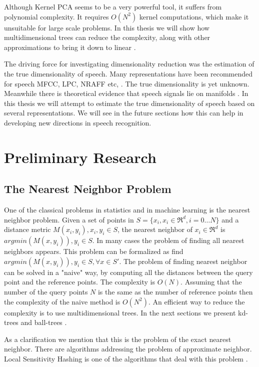 \documentclass[12pt,letterpaper,doublespaced,ETD,dvips,proposal]{gtthesis}
\begin{document}
\begin{Body}
Although Kernel PCA  seems to be a very powerful tool, it suffers from
polynomial complexity. It requires $O(N^2)$ kernel computations,
which make it unsuitable for large scale problems. In this thesis we
will show how  multidimensional trees can reduce
the complexity, along with other approximations to bring it down to
linear \cite{gray2000nbp}.

The driving force for investigating dimensionality reduction was the
estimation of the true dimensionality of speech. Many representations
have been recommended for speech MFCC, LPC, NRAFF etc, \cite{quatieri2002dts,rabiner1978dps, ravindran:inr}. The true
dimensionality is yet unknown. Meanwhile there is theoretical evidence
that speech signals lie on manifolds 
\cite{alder1991dss, sciamarella1999tsc, kumar1990ade, tishby1990dsa, jansen2006ifa}. In
this thesis we will attempt to estimate the true dimensionality of
speech based on several representations. We will see in the future
sections how this can help in developing new directions in speech
recognition.

\section{Preliminary Research}
\label{prelim}
\subsection{The Nearest Neighbor Problem}
\label{The_Nearest_Neighbor_Problem}

One of the classical problems in statistics and in machine learning 
is the nearest neighbor problem. Given a set of points in $S =
\{x_i, x_i\in\Re^d, i=0\dots N\}$ and a distance metric $M(x_i, y_i),
x_i, y_i \in S$,  the nearest neighbor of $x_i \in \Re^d$ is
$argmin(M(x, y_i)), y_i \in S$. In many cases the problem of finding
all nearest neighbors appears. This problem can be formalized as
find $argmin(M(x, y_i)), y_i \in S, \forall x \in S'$. The problem
of finding nearest neighbor can be solved in a "naive" way, by
computing all the distances between the query point and the
reference points. The complexity is $O(N)$. Assuming that the number
of the query points $N$ is the same as the number of reference
points then the complexity of the naive method is $O(N^2)$. An
efficient way to reduce the complexity is to use multidimensional
trees. In the next sections we present kd-trees \cite{moore-tutorial} 
and ball-trees \cite{moore2000ahu}.

As a clarification we mention that this is the problem of the exact
nearest neighbor. There are algorithms addressing the problem of
approximate neighbor. Local Sensitivity Hashing is one of the
algorithms that deal with this problem \cite{datar2004lsh}.


\end{Body}
\end{document}
